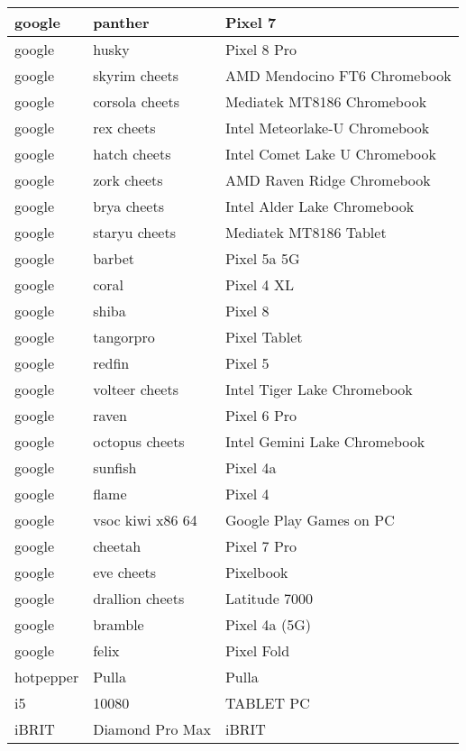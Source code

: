 \begin{tabularx}{\linewidth}{|l|X|X|}
        google & panther & Pixel 7 \\ \hline
        google & husky & Pixel 8 Pro \\ \hline
        google & skyrim cheets & AMD Mendocino FT6 Chromebook \\ \hline
        google & corsola cheets & Mediatek MT8186 Chromebook \\ \hline
        google & rex cheets & Intel Meteorlake-U Chromebook \\ \hline
        google & hatch cheets & Intel Comet Lake U Chromebook \\ \hline
        google & zork cheets & AMD Raven Ridge Chromebook \\ \hline
        google & brya cheets & Intel Alder Lake Chromebook \\ \hline
        google & staryu cheets & Mediatek MT8186 Tablet \\ \hline
        google & barbet & Pixel 5a 5G \\ \hline
        google & coral & Pixel 4 XL \\ \hline
        google & shiba & Pixel 8 \\ \hline
        google & tangorpro & Pixel Tablet \\ \hline
        google & redfin & Pixel 5 \\ \hline
        google & volteer cheets & Intel Tiger Lake Chromebook \\ \hline
        google & raven & Pixel 6 Pro \\ \hline
        google & octopus cheets & Intel Gemini Lake Chromebook \\ \hline
        google & sunfish & Pixel 4a \\ \hline
        google & flame & Pixel 4 \\ \hline
        google & vsoc kiwi x86 64 & Google Play Games on PC \\ \hline
        google & cheetah & Pixel 7 Pro \\ \hline
        google & eve cheets & Pixelbook \\ \hline
        google & drallion cheets & Latitude 7000 \\ \hline
        google & bramble & Pixel 4a (5G) \\ \hline
        google & felix & Pixel Fold \\ \hline
        hotpepper & Pulla & Pulla \\ \hline
        i5 & 10080 & TABLET PC \\ \hline
        iBRIT & Diamond Pro Max & iBRIT \\ \hline

\end{tabularx}
